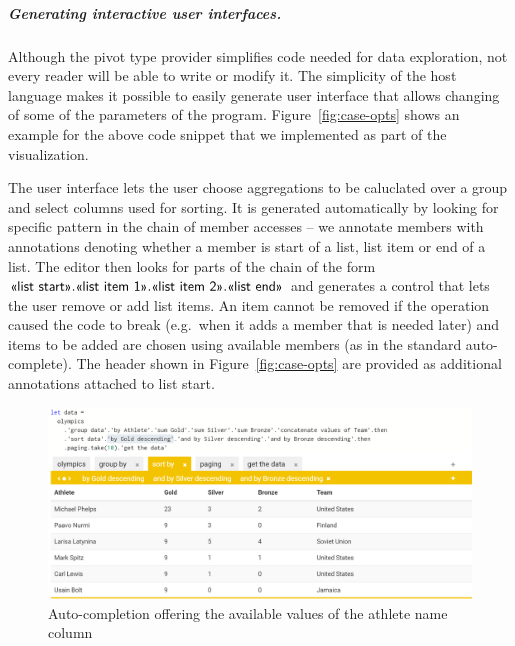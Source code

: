\documentclass[a4paper,UKenglish]{lipics-v2016}
\theoremstyle{plain}
\theoremstyle{definition}
\newcommand{\qident}[1]{\textnormal{\sffamily \guillemotleft #1\guillemotright}}
\begin{document}

\subparagraph{Generating interactive user interfaces.}
Although the pivot type provider simplifies code needed for data exploration, not every reader will 
be able to write or modify it. The simplicity of the host language makes it possible to easily 
generate user interface that allows changing of some of the parameters of the program. 
Figure~\ref{fig:case-opts} shows an example for the above code snippet that we implemented as 
part of the visualization. 

The user interface lets the user choose aggregations to be caluclated over a group and select 
columns used for sorting. It is generated automatically by looking for specific pattern in the 
chain of member accesses -- we annotate members with annotations denoting whether a member is 
start of a list, list item or end of a list. The editor then looks for parts of the chain of the
form $\qident{list start}.\qident{list item 1}.\qident{list item 2}.\qident{list end}$ and generates
a control that lets the user remove or add list items. An item cannot be removed if the operation
caused the code to break (e.g.~when it adds a member that is needed later) and items to be added
are chosen using available members (as in the standard auto-complete). The header
shown in Figure~\ref{fig:case-opts} are provided as additional annotations attached to 
\qident{list start}.



\begin{figure}[t]
\begin{center}
\includegraphics[scale=0.31,trim=0mm 0mm 0mm 0mm,clip]{images/pivot.png} %
\end{center}
\caption{Auto-completion offering the available values of the athlete name column}
\label{fig:case-ed}
\end{figure}
\end{document}
